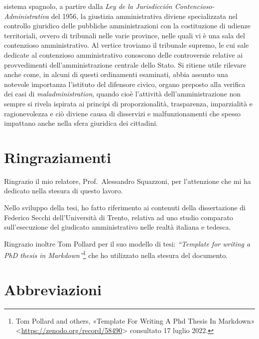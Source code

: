 \documentclass[12pt,it,a4paper,]{report}
\begin{document}
sistema spagnolo, a partire dalla \emph{Ley de la Jurisdicción
Contencioso-Administrativa} del 1956, la giustizia amministrativa
diviene specializzata nel controllo giuridico delle pubbliche
amministrazioni con la costituzione di udienze territoriali, ovvero di
tribunali nelle varie province, nelle quali vi è una sala del
contenzioso amministrativo. Al vertice troviamo il tribunale supremo, le
cui sale dedicate al contenzioso amministrativo conoscono delle
controversie relative ai provvedimenti dell'amministrazione centrale
dello Stato. Si ritiene utile rilevare anche come, in alcuni di questi
ordinamenti esaminati, abbia assunto una notevole importanza l'istituto
del difensore civico, organo preposto alla verifica dei casi di
\emph{maladministration}, quando cioè l'attività dell'amministrazione
non sempre si rivela ispirata ai principi di proporzionalità,
trasparenza, imparzialità e ragionevolezza e ciò diviene causa di
disservizi e malfunzionamenti che spesso impattano anche nella sfera
giuridica dei cittadini.

\hypertarget{ringraziamenti}{%
\chapter*{Ringraziamenti}\label{ringraziamenti}}

Ringrazio il mio relatore, Prof.~Alessandro Squazzoni, per l'attenzione
che mi ha dedicato nella stesura di questo lavoro.

Nello sviluppo della tesi, ho fatto riferimento ai contenuti della
dissertazione di Federico Secchi dell'Università di Trento, relativa ad
uno studio comparato sull'esecuzione del giudicato amministrativo nelle
realtà italiana e tedesca.

Ringrazio inoltre Tom Pollard per il suo modello di tesi:
\emph{``Template for writing a PhD thesis in Markdown''}\footnote{Tom
  Pollard and others, {«Template For Writing A Phd Thesis In Markdown»}
  \textless{}\url{https://zenodo.org/record/58490}\textgreater{}
  consultato 17 luglio 2022.} che ho utilizzato nella stesura del
documento.

\newpage


\tableofcontents

\newpage

\hypertarget{abbreviazioni}{%
\chapter*{Abbreviazioni}\label{abbreviazioni}}
\end{document}
